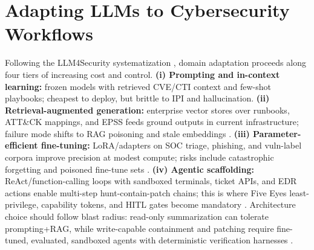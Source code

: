\documentclass[conference,10pt,twocolumn,a4paper]{IEEEtran}
\begin{document}
\section{Adapting LLMs to Cybersecurity Workflows}
\label{sec:adaptation}
Following the LLM4Security systematization \cite{xu2025large}, domain adaptation proceeds along four tiers of increasing cost and control. \textbf{(i) Prompting and in-context learning:} frozen models with retrieved CVE/CTI context and few-shot playbooks; cheapest to deploy, but brittle to IPI and hallucination. \textbf{(ii) Retrieval-augmented generation:} enterprise vector stores over runbooks, ATT\&CK mappings, and EPSS feeds ground outputs in current infrastructure; failure mode shifts to RAG poisoning and stale embeddings \cite{greshake2023indirect, owasp_llm_top10_2025}. \textbf{(iii) Parameter-efficient fine-tuning:} LoRA/adapters on SOC triage, phishing, and vuln-label corpora improve precision at modest compute; risks include catastrophic forgetting and poisoned fine-tune sets \cite{nist_sp_ai_100_2e2025}. \textbf{(iv) Agentic scaffolding:} ReAct/function-calling loops with sandboxed terminals, ticket APIs, and EDR actions enable multi-step hunt-contain-patch chains; this is where Five Eyes least-privilege, capability tokens, and HITL gates become mandatory \cite{cisa_agentic_ai_2026, xiang2026post}. Architecture choice should follow blast radius: read-only summarization can tolerate prompting+RAG, while write-capable containment and patching require fine-tuned, evaluated, sandboxed agents with deterministic verification harnesses \cite{darpa_aixcc_2025}.

\begin{table}[t]
\caption{LLM Adaptation Tiers and Security Controls.}
\label{tab:adaptation}
\centering
\footnotesize
{}
\end{table}
\end{document}
